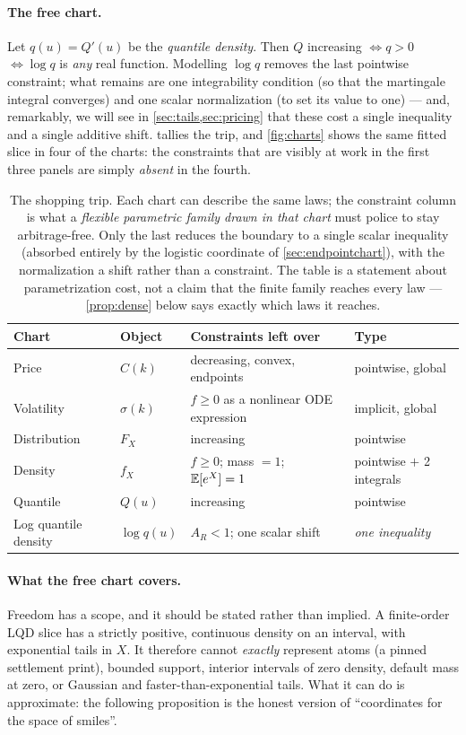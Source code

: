\documentclass[11pt]{article}
\begin{document}
\paragraph{The free chart.}  Let $q(u)=Q'(u)$ be the \emph{quantile density}.
Then $Q$ increasing $\iff q>0$ $\iff \log q$ is \emph{any} real function.
Modelling $\log q$ removes the last pointwise constraint; what remains are
one integrability condition (so that the martingale integral converges) and
one scalar normalization (to set its value to one) --- and, remarkably, we
will see in \cref{sec:tails,sec:pricing} that these cost a single inequality
and a single additive shift.   tallies the trip, and
\cref{fig:charts} shows the same fitted slice in four of the charts: the
constraints that are visibly at work in the first three panels are simply
\emph{absent} in the fourth.

\begin{table}[H]
\centering\small
\begin{tabular}{@{}llll@{}}
\toprule
Chart & Object & Constraints left over & Type\\
\midrule
Price & $C(k)$ & decreasing, convex, endpoints & pointwise, global\\
Volatility & $\sigma(k)$ & $f\ge0$ as a nonlinear ODE expression &
implicit, global\\
Distribution & $F_X$ & increasing & pointwise\\
Density & $f_X$ & $f\ge0$; mass $=1$; $\mathbb{E}[e^{X}]=1$ & pointwise $+$ 2
integrals\\
Quantile & $Q(u)$ & increasing & pointwise\\
Log quantile density & $\log q(u)$ & $A_R<1$; one scalar shift & \emph{one
inequality}\\
\bottomrule
\end{tabular}
\caption{The shopping trip.  Each chart can describe the same laws; the
constraint column is what a \emph{flexible parametric family drawn in that
chart} must police to stay arbitrage-free.  Only the last reduces the
boundary to a single scalar inequality (absorbed entirely by the logistic
coordinate of \cref{sec:endpointchart}), with the normalization a shift
rather than a constraint.  The table is a statement about parametrization
cost, not a claim that the finite family reaches every law ---
\cref{prop:dense} below says exactly which laws it reaches.}
\label{tab:charts}
\end{table}

\paragraph{What the free chart covers.}  Freedom has a scope, and it should
be stated rather than implied.  A finite-order LQD slice has a strictly
positive, continuous density on an interval, with exponential tails in $X$.
It therefore cannot \emph{exactly} represent atoms (a pinned settlement
print), bounded support, interior intervals of zero density, default mass at
zero, or Gaussian and faster-than-exponential tails.  What it can do is
approximate: the following proposition is the honest version of
``coordinates for the space of smiles''.
\end{document}
